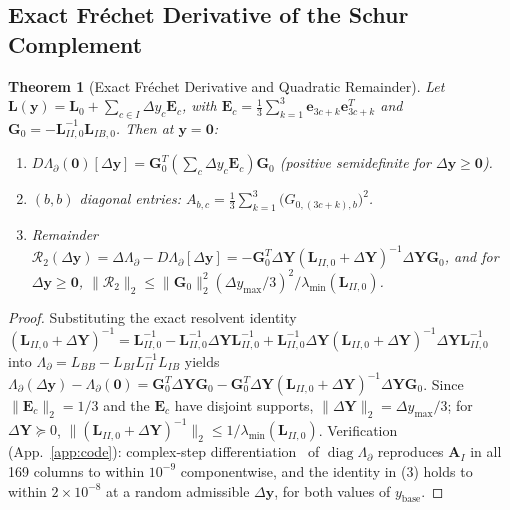 \documentclass[11pt,a4paper]{article}
\newtheorem{theorem}{Theorem}[section]
\theoremstyle{definition}
\theoremstyle{remark}
\begin{document}
\subsection{Exact Fréchet Derivative of the Schur Complement}
\begin{theorem}[Exact Fréchet Derivative and Quadratic Remainder]\label{thm:frechet}
Let $\mathbf{L}(\mathbf{y}) = \mathbf{L}_0 + \sum_{c\in I}\Delta y_c \mathbf{E}_c$, with $\mathbf{E}_c = \tfrac{1}{3}\sum_{k=1}^3\mathbf{e}_{3c+k}\mathbf{e}_{3c+k}^T$ and $\mathbf{G}_0 = -\mathbf{L}_{II,0}^{-1}\mathbf{L}_{IB,0}$. Then at $\mathbf{y}=\mathbf{0}$:
\begin{enumerate}
\item $D\Lambda_\partial(\mathbf{0})[\Delta\mathbf{y}] = \mathbf{G}_0^T\left(\sum_c \Delta y_c \mathbf{E}_c\right)\mathbf{G}_0$ (positive semidefinite for $\Delta\mathbf{y}\ge\mathbf{0}$).
\item $(b,b)$ diagonal entries: $A_{b,c} = \frac{1}{3}\sum_{k=1}^3 \big(G_{0,(3c+k),b}\big)^2$.
\item Remainder $\mathcal{R}_2(\Delta\mathbf{y}) = \Delta\Lambda_\partial - D\Lambda_\partial[\Delta\mathbf{y}] = -\mathbf{G}_0^T \Delta\mathbf{Y}(\mathbf{L}_{II,0}+\Delta\mathbf{Y})^{-1}\Delta\mathbf{Y}\mathbf{G}_0$, and for $\Delta\mathbf{y}\ge\mathbf{0}$, $\|\mathcal{R}_2\|_2 \le \|\mathbf{G}_0\|_2^2 (\Delta y_{\max}/3)^2 / \lambda_{\min}(\mathbf{L}_{II,0})$.
\end{enumerate}
\end{theorem}
\begin{proof}
Substituting the exact resolvent identity $(\mathbf{L}_{II,0}+\Delta\mathbf{Y})^{-1} = \mathbf{L}_{II,0}^{-1} - \mathbf{L}_{II,0}^{-1}\Delta\mathbf{Y}\mathbf{L}_{II,0}^{-1} + \mathbf{L}_{II,0}^{-1}\Delta\mathbf{Y}(\mathbf{L}_{II,0}+\Delta\mathbf{Y})^{-1}\Delta\mathbf{Y}\mathbf{L}_{II,0}^{-1}$ into $\Lambda_\partial = L_{BB} - L_{BI}L_{II}^{-1}L_{IB}$ yields $\Lambda_\partial(\Delta\mathbf{y}) - \Lambda_\partial(\mathbf{0}) = \mathbf{G}_0^T\Delta\mathbf{Y}\mathbf{G}_0 - \mathbf{G}_0^T\Delta\mathbf{Y}(\mathbf{L}_{II,0}+\Delta\mathbf{Y})^{-1}\Delta\mathbf{Y}\mathbf{G}_0$. Since $\|\mathbf{E}_c\|_2 = 1/3$ and the $\mathbf{E}_c$ have disjoint supports, $\|\Delta\mathbf{Y}\|_2 = \Delta y_{\max}/3$; for $\Delta\mathbf{Y}\succeq0$, $\|(\mathbf{L}_{II,0}+\Delta\mathbf{Y})^{-1}\|_2 \le 1/\lambda_{\min}(\mathbf{L}_{II,0})$. Verification (App.~\ref{app:code}): complex-step differentiation~\cite{squire1998} of $\operatorname{diag}\Lambda_\partial$ reproduces $\mathbf{A}_I$ in all 169 columns to within $10^{-9}$ componentwise, and the identity in (3) holds to within $2\times10^{-8}$ at a random admissible $\Delta\mathbf{y}$, for both values of $y_{\text{base}}$.
\end{proof}
\end{document}
